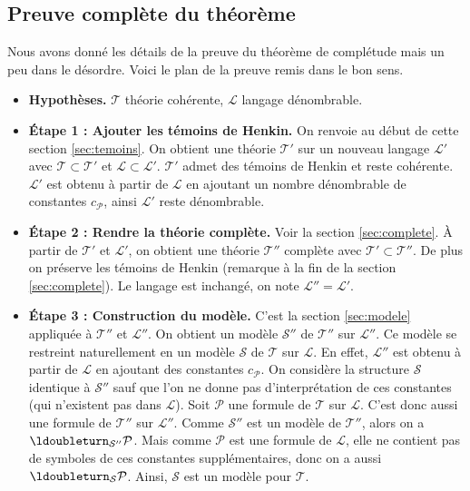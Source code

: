\documentclass[11pt,class=report,crop=false]{standalone}
\begin{document}
\subsection{Preuve complète du théorème}

Nous avons donné les détails de la preuve du théorème de complétude mais un peu dans le désordre. Voici le plan de la preuve remis dans le bon sens.

\begin{itemize}
	\item \textbf{Hypothèses.} $\mathcal{T}$ théorie cohérente, $\mathcal{L}$ langage dénombrable.
	
	\item \textbf{Étape 1 : Ajouter les témoins de Henkin.} 
	On renvoie au début de cette section \ref{sec:temoins}.
	On obtient une théorie $\mathcal{T}'$ sur un nouveau langage $\mathcal{L}'$ avec $\mathcal{T} \subset \mathcal{T}'$ et $\mathcal{L} \subset \mathcal{L}'$.
	$\mathcal{T}'$ admet des témoins de Henkin et reste cohérente.
	$\mathcal{L}'$ est obtenu à partir de $\mathcal{L}$ en ajoutant un nombre dénombrable de constantes $c_{\mathcal{P}}$, ainsi $\mathcal{L}'$ reste dénombrable.
	
	\item \textbf{Étape 2 : Rendre la théorie complète.} 
	Voir la section \ref{sec:complete}.
	À partir de $\mathcal{T}'$ et $\mathcal{L}'$, on obtient une théorie $\mathcal{T}''$ complète avec $\mathcal{T}' \subset \mathcal{T}''$.	
	De plus on préserve les témoins de Henkin (remarque à la fin de la section \ref{sec:complete}). Le langage est inchangé, on note $\mathcal{L}'' = \mathcal{L}'$.
	
	\item \textbf{Étape 3 : Construction du modèle.}
	C'est la section \ref{sec:modele} appliquée à $\mathcal{T}''$ et $\mathcal{L}''$.
	On obtient un modèle $\mathcal{S}''$ de $\mathcal{T}''$ sur $\mathcal{L}''$.
	Ce modèle se restreint naturellement en un modèle $\mathcal{S}$ de $\mathcal{T}$ sur $\mathcal{L}$.
	En effet, $\mathcal{L}''$ est obtenu à partir de $\mathcal{L}$ en ajoutant des constantes $c_{\mathcal{P}}$.
	On considère la structure $\mathcal{S}$ identique à $\mathcal{S}''$ sauf que l'on ne donne pas d'interprétation de ces constantes (qui n'existent pas dans $\mathcal{L}$).
	Soit $\mathcal{P}$ une formule de $\mathcal{T}$ sur $\mathcal{L}$. 
    C'est donc aussi une formule de $\mathcal{T}''$ sur $\mathcal{L}''$.
    Comme $\mathcal{S}''$ est un modèle de $\mathcal{T}''$, alors on a $\ldoubleturn_{\mathcal{S}''} \mathcal{P}$.
	Mais comme $\mathcal{P}$ est une formule de $\mathcal{L}$, elle ne contient pas de symboles de ces constantes supplémentaires, donc on a aussi $\ldoubleturn_{\mathcal{S}} \mathcal{P}$.
	Ainsi, $\mathcal{S}$ est un modèle pour $\mathcal{T}$.

\end{itemize}
\end{document}
